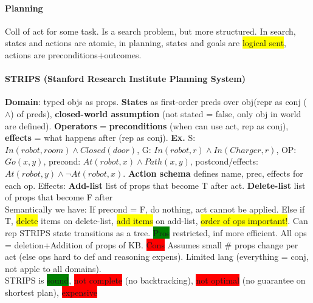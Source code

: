 \paragraph{Planning} Coll of act for some task. Is a search problem,
but more structured. In search, states and actions are atomic, in
planning, states and goals are \colorbox{yellow}{logical sent},
actions are preconditions+outcomes.
\paragraph{STRIPS (Stanford Research Institute Planning System)}
\textbf{Domain}: typed objs as props. \textbf{States} as first-order
preds over obj(repr as conj ($\land$) of preds), \textbf{closed-world assumption} (not stated = false,
only obj in world are defined). \textbf{Operators} =
\textbf{preconditions} (when can use act, rep as conj), \textbf{effects} = what
happens after (rep as conj). \textbf{Ex.} S: $In(robot,room)\land
Closed(door)$, G: $In(robot,r) \land In(Charger, r)$, OP: $Go(x,y)$,
precond: $At(robot, x)\land Path(x,y)$, postcond/effects: $At(robot,y)\land
\neg At(robot,x)$. \textbf{Action schema} defines name, prec, effects for
each op. Effects: \textbf{Add-list} list of props that become T after
act. \textbf{Delete-list} list of props that become F after
\\ Semantically we have: If precond = F, do nothing, act cannot be
applied. Else if T, \colorbox{yellow}{delete} items on delete-list,
\colorbox{yellow}{add items} on add-list, \colorbox{yellow}{order of
  ops important!}. Can rep STRIPS state transitions as a
tree. \colorbox{green}{Pros} restricted, inf more efficient. All ops =
deletion+Addition of props of KB. \colorbox{red}{Cons} Assumes small
\# props change per act (else ops hard to def and reasoning
expens). Limited lang (everything = conj, not applc to all domains).
\\ STRIPS is \colorbox{green}{sound}, \colorbox{red}{not complete} (no
backtracking), \colorbox{red}{not optimal} (no guarantee on shortest
plan), \colorbox{red}{expensive}
